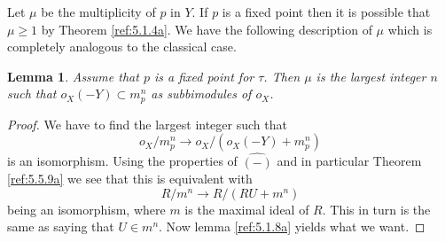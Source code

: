 \documentclass{amsproc}
\def\r{\rightarrow}
\newtheorem{lemmas}{Lemma}[subsection]
\theoremstyle{definition}
\theoremstyle{remark}
\numberwithin{equation}{section}
\numberwithin{table}{section}
\numberwithin{figure}{section}
\begin{document}
Let $\mu$ be the multiplicity of $p$ in $Y$. If $p$ is a fixed point
then it is possible that $\mu\ge 1$ by Theorem \ref{ref:5.1.4a}. We
have the following description of $\mu$ which is completely analogous
to the classical case.
\begin{lemmas} 
\label{ref:6.1.4a}
Assume that $p$ is a fixed point for $\tau$. Then $\mu$
  is the largest integer $n$ such that $o_X(-Y)\subset m_p^n$ as
  subbimodules of $o_X$.
\end{lemmas}
\begin{proof}
We have to find the largest integer such that 
\[
o_X/m^n_p\r o_X/(o_X(-Y)+m^n_p)
\]
is  an isomorphism. Using the properties of $\hat{(-)}$ and in
particular Theorem \ref{ref:5.5.9a} we see that
this is equivalent with 
\[
R/m^n\r R/(RU+m^n)
\]
being an isomorphism, where $m$ is the maximal ideal of $R$. This in
turn is the same as saying that $U\in m^n$.  Now lemma \ref{ref:5.1.8a}
yields what we want.
\end{proof}
\end{document}
